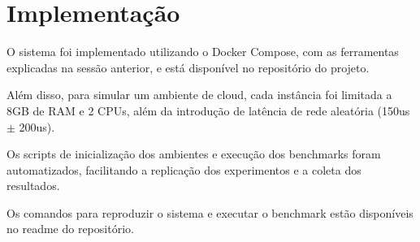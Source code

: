 \section{Implementação}

O sistema foi implementado utilizando o Docker Compose, com as ferramentas explicadas na sessão anterior,
e está disponível no repositório do projeto.

Além disso, para simular um ambiente de cloud, cada instância foi limitada a 8GB de RAM e 2 CPUs,
além da introdução de latência de rede aleatória (150us $\pm$ 200us). 

Os scripts de inicialização dos ambientes e execução dos benchmarks foram automatizados,
facilitando a replicação dos experimentos e a coleta dos resultados.

Os comandos para reproduzir o sistema e executar o benchmark estão disponíveis no readme do repositório.